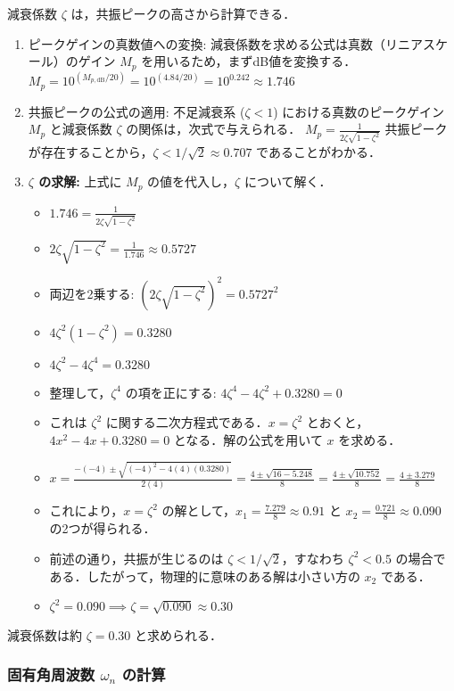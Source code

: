 \documentclass[11pt,a4paper]{ltjsarticle}
\newcommand{\supcite}[1]{\textsuperscript{\cite{#1}}}
\begin{document}
減衰係数 $\zeta$ は，共振ピークの高さから計算できる．
\begin{enumerate}
    \item ピークゲインの真数値への変換: 減衰係数を求める公式は真数（リニアスケール）のゲイン $M_p$ を用いるため，まずdB値を変換する．
    $M_p = 10^{(M_{p,\text{dB}}/20)} = 10^{(4.84/20)} = 10^{0.242} \approx 1.746$
    \item 共振ピークの公式の適用: 不足減衰系 ($\zeta < 1$) における真数のピークゲイン $M_p$ と減衰係数 $\zeta$ の関係は，次式で与えられる．
    $M_p = \frac{1}{2\zeta\sqrt{1-\zeta^2}}$
    共振ピークが存在することから，$\zeta < 1/\sqrt{2} \approx 0.707$ であることがわかる\supcite{ref3}．
    \item \textbf{$\zeta$ の求解:} 上式に $M_p$ の値を代入し，$\zeta$ について解く．
    \begin{itemize}
        \item $1.746 = \frac{1}{2\zeta\sqrt{1-\zeta^2}}$
        \item $2\zeta\sqrt{1-\zeta^2} = \frac{1}{1.746} \approx 0.5727$
        \item 両辺を2乗する: $(2\zeta\sqrt{1-\zeta^2})^2 = 0.5727^2$
        \item $4\zeta^2(1-\zeta^2) = 0.3280$
        \item $4\zeta^2 - 4\zeta^4 = 0.3280$
        \item 整理して，$\zeta^4$ の項を正にする: $4\zeta^4 - 4\zeta^2 + 0.3280 = 0$
        \item これは $\zeta^2$ に関する二次方程式である．$x=\zeta^2$ とおくと，$4x^2 - 4x + 0.3280 = 0$ となる．解の公式を用いて $x$ を求める．
        \item $x = \frac{-(-4) \pm \sqrt{(-4)^2 - 4(4)(0.3280)}}{2(4)} = \frac{4 \pm \sqrt{16 - 5.248}}{8} = \frac{4 \pm \sqrt{10.752}}{8} = \frac{4 \pm 3.279}{8}$
        \item これにより，$x=\zeta^2$ の解として，$x_1 = \frac{7.279}{8} \approx 0.91$ と $x_2 = \frac{0.721}{8} \approx 0.090$ の2つが得られる．
        \item 前述の通り，共振が生じるのは $\zeta < 1/\sqrt{2}$，すなわち $\zeta^2 < 0.5$ の場合である．したがって，物理的に意味のある解は小さい方の $x_2$ である．
        \item $\zeta^2 = 0.090 \implies \zeta = \sqrt{0.090} \approx 0.30$
    \end{itemize}
\end{enumerate}
減衰係数は約 $\zeta=0.30$ と求められる．

\subsubsection{固有角周波数 \texorpdfstring{$\omega_n$}{ωn} の計算}
\end{document}
